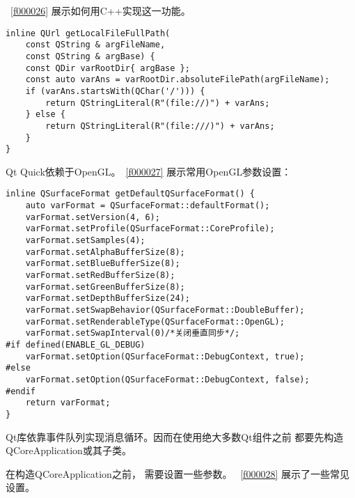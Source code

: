 \lstlistingname\ \ref{f000026}
展示如何用C{\sourcefonttwo{}+}{\sourcefonttwo{}+}实现这一功能。

\FloatBarrier
\begin{lstlisting}[label=f000026,
caption=GoodLuck,
title=\lstlistingname\ \thelstlisting\marginnote{\fbox{\footnotesize{\lstlistingname\ \thelstlisting}}}
,firstnumber=6]
inline QUrl getLocalFileFullPath(
    const QString & argFileName,
    const QString & argBase) {
    const QDir varRootDir{ argBase };
    const auto varAns = varRootDir.absoluteFilePath(argFileName);
    if (varAns.startsWith(QChar('/'))) {
        return QStringLiteral(R"(file://)") + varAns;
    } else {
        return QStringLiteral(R"(file:///)") + varAns;
    }
}
\end{lstlisting}          %

Qt Quick依赖于OpenGL。\lstlistingname\ \ref{f000027}
展示常用OpenGL参数设置：

\FloatBarrier
\begin{lstlisting}[label=f000027,
caption=GoodLuck,
title=\lstlistingname\ \thelstlisting\marginnote{\fbox{\footnotesize{\lstlistingname\ \thelstlisting}}}
,firstnumber=18]
inline QSurfaceFormat getDefaultQSurfaceFormat() {
    auto varFormat = QSurfaceFormat::defaultFormat();
    varFormat.setVersion(4, 6);
    varFormat.setProfile(QSurfaceFormat::CoreProfile);
    varFormat.setSamples(4);
    varFormat.setAlphaBufferSize(8);
    varFormat.setBlueBufferSize(8);
    varFormat.setRedBufferSize(8);
    varFormat.setGreenBufferSize(8);
    varFormat.setDepthBufferSize(24);
    varFormat.setSwapBehavior(QSurfaceFormat::DoubleBuffer);
    varFormat.setRenderableType(QSurfaceFormat::OpenGL);
    varFormat.setSwapInterval(0)/*关闭垂直同步*/;
#if defined(ENABLE_GL_DEBUG)
    varFormat.setOption(QSurfaceFormat::DebugContext, true);
#else
    varFormat.setOption(QSurfaceFormat::DebugContext, false);
#endif
    return varFormat;
}
\end{lstlisting}          %

Qt库依靠事件队列实现消息循环。因而在使用绝大多数Qt组件之前
都要先构造QCoreApplication或其子类。

在构造QCoreApplication之前，
需要设置一些参数。
\lstlistingname\ \ref{f000028}
展示了一些常见设置。

